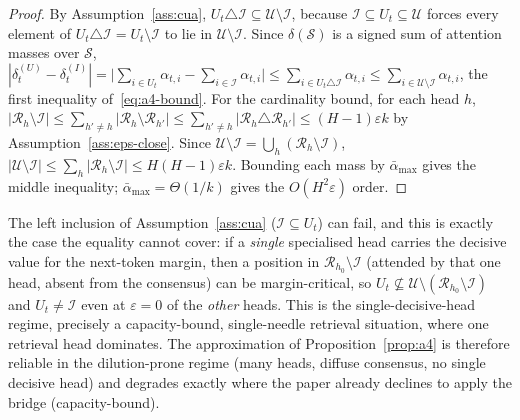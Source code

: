 \begin{proof}
By Assumption~\ref{ass:cua}, $U_t\triangle\mathcal{I}\subseteq\mathcal{U}\setminus\mathcal{I}$,
because $\mathcal{I}\subseteq U_t\subseteq\mathcal{U}$ forces every element of
$U_t\triangle\mathcal{I}=U_t\setminus\mathcal{I}$ to lie in
$\mathcal{U}\setminus\mathcal{I}$. Since $\delta(\mathcal{S})$ is a signed sum of
attention masses over $\mathcal{S}$,
$|\delta^{(U)}_t-\delta^{(I)}_t|
=\bigl|\sum_{i\in U_t}\alpha_{t,i}-\sum_{i\in\mathcal{I}}\alpha_{t,i}\bigr|
\le\sum_{i\in U_t\triangle\mathcal{I}}\alpha_{t,i}
\le\sum_{i\in\mathcal{U}\setminus\mathcal{I}}\alpha_{t,i}$,
the first inequality of~\eqref{eq:a4-bound}. For the cardinality bound, for each
head $h$,
$|\mathcal{R}_h\setminus\mathcal{I}|\le\sum_{h'\ne h}|\mathcal{R}_h\setminus\mathcal{R}_{h'}|
\le\sum_{h'\ne h}|\mathcal{R}_h\triangle\mathcal{R}_{h'}|\le(H-1)\varepsilon k$
by Assumption~\ref{ass:eps-close}. Since
$\mathcal{U}\setminus\mathcal{I}=\bigcup_h(\mathcal{R}_h\setminus\mathcal{I})$,
$|\mathcal{U}\setminus\mathcal{I}|\le\sum_h|\mathcal{R}_h\setminus\mathcal{I}|\le H(H-1)\varepsilon k$.
Bounding each mass by $\bar\alpha_{\max}$ gives the middle inequality;
$\bar\alpha_{\max}=\Theta(1/k)$ gives the $O(H^2\varepsilon)$ order.
\end{proof}

\begin{remark}
\label{rem:a4-fail}
The left inclusion of Assumption~\ref{ass:cua} ($\mathcal{I}\subseteq U_t$) can
fail, and this is exactly the case the equality cannot cover: if a
\emph{single} specialised head carries the decisive value for the next-token
margin, then a position in $\mathcal{R}_{h_0}\setminus\mathcal{I}$ (attended by
that one head, absent from the consensus) can be margin-critical, so
$U_t\not\subseteq\mathcal{U}\setminus(\mathcal{R}_{h_0}\setminus\mathcal{I})$ and
$U_t\ne\mathcal{I}$ even at $\varepsilon=0$ of the \emph{other} heads. This is
the single-decisive-head regime, precisely a capacity-bound, single-needle
retrieval situation, where one retrieval head dominates. The approximation of
Proposition~\ref{prop:a4} is therefore reliable in the dilution-prone regime
(many heads, diffuse consensus, no single decisive head) and degrades exactly
where the paper already declines to apply the bridge (capacity-bound).
\end{remark}

